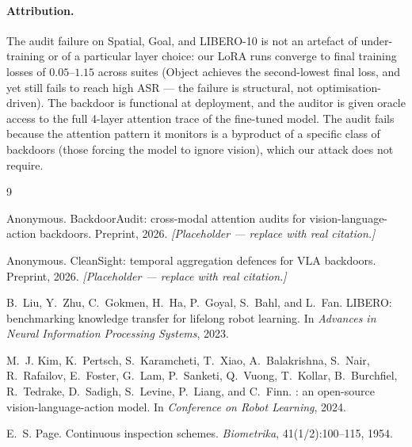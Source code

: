 \documentclass[11pt]{article}
\begin{document}
\paragraph{Attribution.} The audit failure on Spatial, Goal, and
LIBERO-10 is not an artefact of under-training or of a particular
layer choice: our LoRA runs converge to final training losses of
$0.05$--$1.15$ across suites (Object achieves the second-lowest final
loss, and yet still fails to reach high ASR --- the failure is
structural, not optimisation-driven). The backdoor is functional at
deployment, and the auditor is given oracle access to the full
4-layer attention trace of the fine-tuned model. The audit fails
because the attention pattern it monitors is a byproduct of a
specific class of backdoors (those forcing the model to ignore
vision), which our attack does not require.


\begin{thebibliography}{9}

Anonymous.
\newblock BackdoorAudit: cross-modal attention audits for
  vision-language-action backdoors.
\newblock Preprint, 2026. \emph{[Placeholder --- replace with real citation.]}

Anonymous.
\newblock CleanSight: temporal aggregation defences for VLA backdoors.
\newblock Preprint, 2026. \emph{[Placeholder --- replace with real citation.]}

B.~Liu, Y.~Zhu, C.~Gokmen, H.~Ha, P.~Goyal, S.~Bahl, and L.~Fan.
\newblock LIBERO: benchmarking knowledge transfer for lifelong robot
  learning.
\newblock In \emph{Advances in Neural Information Processing Systems},
  2023.

M.~J. Kim, K.~Pertsch, S.~Karamcheti, T.~Xiao, A.~Balakrishna,
  S.~Nair, R.~Rafailov, E.~Foster, G.~Lam, P.~Sanketi, Q.~Vuong,
  T.~Kollar, B.~Burchfiel, R.~Tedrake, D.~Sadigh, S.~Levine,
  P.~Liang, and C.~Finn.
: an open-source vision-language-action model.
\newblock In \emph{Conference on Robot Learning}, 2024.

E.~S. Page.
\newblock Continuous inspection schemes.
\newblock \emph{Biometrika}, 41(1/2):100--115, 1954.

\end{thebibliography}
\end{document}

